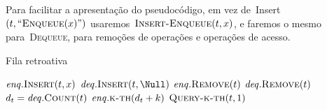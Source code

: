 \documentclass[quali.tex]{subfile}
\begin{document}
Para facilitar a apresentação do pseudocódigo, em vez de~Insert$(t, ``\Call{Enqueue}{x}")$ usaremos~$\Call{Insert-Enqueue}{t, x}$, e faremos o mesmo para~\textsc{Dequeue}, para remoções de operações e operações de acesso.

\begin{algorithm}
\caption{Fila retroativa} \label{lst:filaretro}
\begin{algorithmic}[1]
		\State $\enqs.\Call{Insert}{t, x}$
	\EndFunction
		\State $\deqs.\Call{Insert}{t, \Null}$
	\EndFunction
		\State $\enqs.\Call{Remove}{t}$
	\EndFunction
		\State $\deqs.\Call{Remove}{t}$
	\EndFunction
		\State $d_t = \deqs.\Call{Count}{t}$ 
		\State \Return $\enqs.\Call{k-th}{d_t + k}$
	\EndFunction
		\State \Return $\Call{Query-k-th}{t, 1}$
	\EndFunction
\end{algorithmic}
\end{algorithm}
\end{document}
